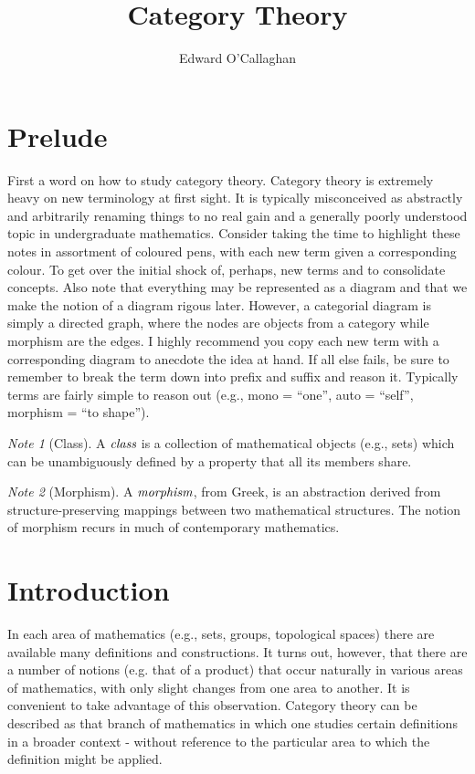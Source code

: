 \documentclass[10pt, oneside, reqno]{amsart}
\title{Category Theory}                               %
\author{Edward O'Callaghan}
\theoremstyle{plain}%
\theoremstyle{definition}
\theoremstyle{remark}
\newtheorem*{note}{Note}
\begin{document}
\maketitle \tableofcontents \clearpage

\section{Prelude} %
\label{sec:purelude}
First a word on how to study category theory. Category theory is extremely heavy on new terminology at first sight.
It is typically misconceived as abstractly and arbitrarily renaming things to no real gain and a generally poorly understood
topic in undergraduate mathematics. Consider taking the time to highlight these notes in assortment of coloured pens,
with each new term given a corresponding colour. To get over the initial shock of, perhaps, new terms and to consolidate concepts.
Also note that everything may be represented as a diagram and that we make the notion of a diagram rigous later. However,
a categorial diagram is simply a directed graph, where the nodes are objects from a category while morphism are the edges.
I highly recommend you copy each new term with a corresponding diagram to anecdote the idea at hand.
If all else fails, be sure to remember to break the term down into prefix and suffix and reason it.
Typically terms are fairly simple to reason out (e.g., mono = ``one'', auto = ``self'', morphism = ``to shape'').

\begin{note}[Class]
 A $\emph{class}$ is a collection of mathematical objects (e.g., sets)
 which can be unambiguously defined by a property that all its members share.
\end{note}

\begin{note}[Morphism]
 A $\emph{morphism}$, from Greek, is an abstraction derived from
 structure-preserving mappings between two mathematical structures.
 The notion of morphism recurs in much of contemporary mathematics.
\end{note}

\section{Introduction} %
\label{sec:introduction}
In each area of mathematics (e.g., sets, groups, topological spaces) there are available many definitions
and constructions. It turns out, however, that there are a number of notions (e.g. that of a product)
that occur naturally in various areas of mathematics, with only slight changes from one area to another.
It is convenient to take advantage of this observation. Category theory can be described as that branch of mathematics
in which one studies certain definitions in a broader context - without reference to the particular area to which
the definition might be applied.
\end{document}
